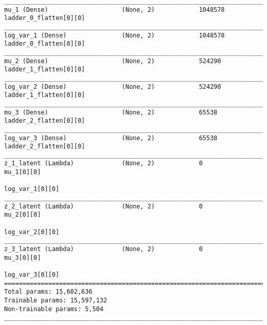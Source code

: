 \begin{lstlisting}[caption={CelebA-VLAE-GAN Encoder},captionpos=b,basicstyle=\tiny, label={lst:mnist-vlae-gan-encoder}]
__________________________________________________________________________________________________
mu_1 (Dense)                    (None, 2)            1048578     ladder_0_flatten[0][0]
__________________________________________________________________________________________________
log_var_1 (Dense)               (None, 2)            1048578     ladder_0_flatten[0][0]
__________________________________________________________________________________________________
mu_2 (Dense)                    (None, 2)            524290      ladder_1_flatten[0][0]
__________________________________________________________________________________________________
log_var_2 (Dense)               (None, 2)            524290      ladder_1_flatten[0][0]
__________________________________________________________________________________________________
mu_3 (Dense)                    (None, 2)            65538       ladder_2_flatten[0][0]
__________________________________________________________________________________________________
log_var_3 (Dense)               (None, 2)            65538       ladder_2_flatten[0][0]
__________________________________________________________________________________________________
z_1_latent (Lambda)             (None, 2)            0           mu_1[0][0]
                                                                 log_var_1[0][0]
__________________________________________________________________________________________________
z_2_latent (Lambda)             (None, 2)            0           mu_2[0][0]
                                                                 log_var_2[0][0]
__________________________________________________________________________________________________
z_3_latent (Lambda)             (None, 2)            0           mu_3[0][0]
                                                                 log_var_3[0][0]
==================================================================================================
Total params: 15,602,636
Trainable params: 15,597,132
Non-trainable params: 5,504
__________________________________________________________________________________________________
\end{lstlisting}